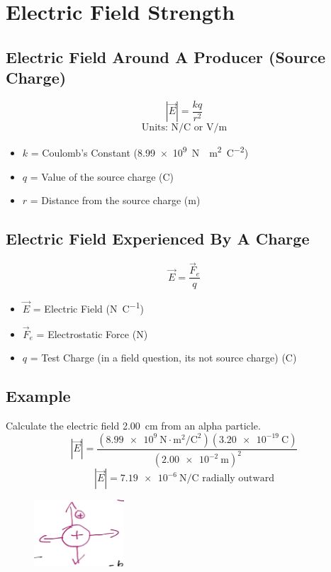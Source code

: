 \documentclass[a4paper,12pt]{article}
\begin{document}
\section{Electric Field Strength}
\subsection{Electric Field Around A Producer (Source Charge)}
\Large $$|\vec{E}| = \frac{kq}{r^2}$$ \normalsize
$$\textrm{Units: } \si{\newton\per\coulomb} \textrm{ or } \si{\V\per\m}$$
\begin{itemize}
    \item{$k$ = Coulomb's Constant (\SI{8.99e9}{\newton\cdot\m\squared\per\coulomb\squared})}
    \item{$q$ = Value of the source charge (\si{\coulomb})}
    \item{$r$ = Distance from the source charge (\si{\m})}
\end{itemize}

\subsection{Electric Field Experienced By A Charge}
\Large $$\vec{E} = \frac{\vec{F}_e}{q}$$ \normalsize
\begin{itemize}
    \item{$\vec{E}$ = Electric Field (\si{\newton\per\coulomb})}
    \item{$\vec{F}_e$ = Electrostatic Force (\si{\newton})}
    \item{$q$ = Test Charge (in a field question, its not source charge) (\si{\coulomb})}
\end{itemize}

\subsection{Example}
Calculate the electric field \SI{2.00}{\cm} from an alpha particle.
$$|\vec{E}| = \frac{(\SI{8.99e9}{\newton\cdot\m\squared\per\coulomb\squared})(\SI{3.20e-19}{\coulomb})}{(\SI{2.00e-2}{\m})^2}$$
$$|\vec{E}| = \SI{7.19e-6}{\newton\per\coulomb} \textrm{ radially outward}$$
\begin{figure}[H]
    \centering
    \includegraphics[width=0.3\textwidth]{fieldquestion}
\end{figure}
\end{document}
